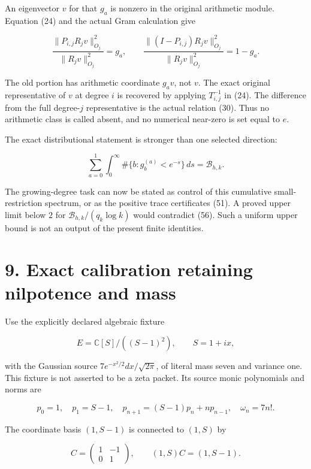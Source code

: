 \documentclass[
  11pt,
]{article}
\begin{document}
An eigenvector \(v\) for that \(g_a\) is nonzero in the original
arithmetic module. Equation (24) and the actual Gram calculation give

\[
 \boxed{
 \frac{\|P_{i,j}R_jv\|_{O_j}^2}{\|R_jv\|_{O_j}^2}
 =g_a,\qquad
 \frac{\|(I-P_{i,j})R_jv\|_{O_j}^2}{\|R_jv\|_{O_j}^2}=1-g_a.}      \tag{57}
\]

The old portion has arithmetic coordinate \(g_av\), not \(v\). The exact
original representative of \(v\) at degree \(i\) is recovered by
applying \(T_{i,j}^{-1}\) in (24). The difference from the full
degree-\(j\) representative is the actual relation (30). Thus no
arithmetic class is called absent, and no numerical near-zero is set
equal to \(e\).

The exact distributional statement is stronger than one selected
direction:

\[
 \sum_{a=0}^1\int_0^\infty
   \#\{b:g_b^{(a)}<e^{-s}\}\,ds
 =\mathcal B_{h,k}.                                               \tag{58}
\]

The growing-degree task can now be stated as control of this cumulative
small-restriction spectrum, or as the positive trace certificates (51).
A proved upper limit below \(2\) for \(\mathcal B_{h,k}/(q_k\log k)\)
would contradict (56). Such a uniform upper bound is not an output of
the present finite identities.

\section{9. Exact calibration retaining nilpotence and
mass}\label{exact-calibration-retaining-nilpotence-and-mass}

Use the explicitly declared algebraic fixture

\[
 E=\mathbb C[S]/((S-1)^2),\qquad S=1+ix,
                                                                    \tag{59}
\]

with the Gaussian source \(7e^{-x^2/2}dx/\sqrt{2\pi}\), of literal mass
seven and variance one. This fixture is not asserted to be a zeta
packet. Its source monic polynomials and norms are

\[
 p_0=1,\quad p_1=S-1,\quad
 p_{n+1}=(S-1)p_n+n p_{n-1},\quad \omega_n=7n!.                    \tag{60}
\]

The coordinate basis \((1,S-1)\) is connected to \((1,S)\) by

\[
 C=\begin{pmatrix}1&-1\\0&1\end{pmatrix},\qquad
 (1,S)C=(1,S-1).                                                  \tag{61}
\]
\end{document}

